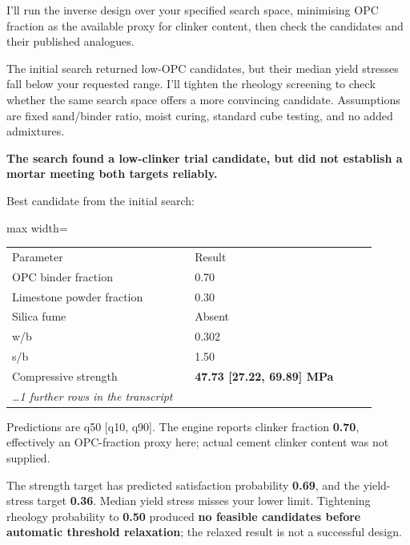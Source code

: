 \begin{agentbox}
I'll run the inverse design over your specified search space, minimising OPC fraction as the available proxy for clinker content, then check the candidates and their published analogues.\par
The initial search returned low-OPC candidates, but their median yield stresses fall below your requested range. I'll tighten the rheology screening to check whether the same search space offers a more convincing candidate. Assumptions are fixed sand/binder ratio, moist curing, standard cube testing, and no added admixtures.\par
\textbf{The search found a low-clinker trial candidate, but did not establish a mortar meeting both targets reliably.}\par
\par
Best candidate from the initial search:\par
\par
\par\smallskip\begin{adjustbox}{max width=\linewidth}\begin{tabular}{p{0.47\linewidth}p{0.47\linewidth}}
Parameter & Result \\
OPC binder fraction & 0.70 \\
Limestone powder fraction & 0.30 \\
Silica fume & Absent \\
w/b & 0.302 \\
s/b & 1.50 \\
Compressive strength & \textbf{47.73 [27.22, 69.89] MPa} \\
\multicolumn{1}{l}{\textit{\ldots 1 further rows in the transcript}} \\
\end{tabular}\end{adjustbox}\par\smallskip
\par
Predictions are q50 [q10, q90]. The engine reports clinker fraction \textbf{0.70}, effectively an OPC-fraction proxy here; actual cement clinker content was not supplied.\par
\par
The strength target has predicted satisfaction probability \textbf{0.69}, and the yield-stress target \textbf{0.36}. Median yield stress misses your lower limit. Tightening rheology probability to \textbf{0.50} produced \textbf{no feasible candidates before automatic threshold relaxation}; the relaxed result is not a successful design.\par

\end{agentbox}
